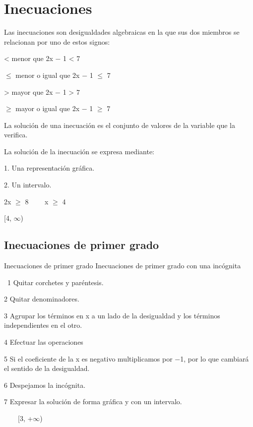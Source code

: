 \documentclass{article}
\begin{document}
\section[Inecuaciones]{Inecuaciones}

\bigskip

Las inecuaciones son desigualdades algebraicas en la que sus dos miembros se relacionan por uno de estos signos:

{\textless} menor que 2x $-$ 1 {\textless} 7

${\leq}$ menor o igual que 2x $-$ 1 ${\leq}$ 7

{\textgreater} mayor que 2x $-$ 1 {\textgreater} 7

${\geq}$ mayor o igual que 2x $-$ 1 ${\geq}$ 7 \ \ 

La soluci\'on de una inecuaci\'on es el conjunto de valores de la variable que la verifica.

La soluci\'on de la inecuaci\'on se expresa mediante:

1. Una representaci\'on gr\'afica.

2. Un intervalo.

2x ${\geq}$ 8 \ \ \ \ x ${\geq}$ 4 \ 

[4, ${\infty}$)

\subsection[Inecuaciones de primer grado]{Inecuaciones de primer grado}

\bigskip

Inecuaciones de primer grado Inecuaciones de primer grado con una inc\'ognita

\ 1{\textordmasculine} Quitar corchetes y par\'entesis.

2{\textordmasculine} Quitar denominadores.

3{\textordmasculine} Agrupar los t\'erminos en x a un lado de la desigualdad y los t\'erminos independientes en el otro.

4{\textordmasculine} Efectuar las operaciones

5{\textordmasculine} Si el coeficiente de la x es negativo multiplicamos por $-$1, por lo que cambiar\'a el sentido de la desigualdad.

6{\textordmasculine} Despejamos la inc\'ognita.

7{\textordmasculine} Expresar la soluci\'on de forma gr\'afica y con un intervalo. \ \ \ \ \ 

\ \ \ \ [3, +${\infty}$)
\end{document}

